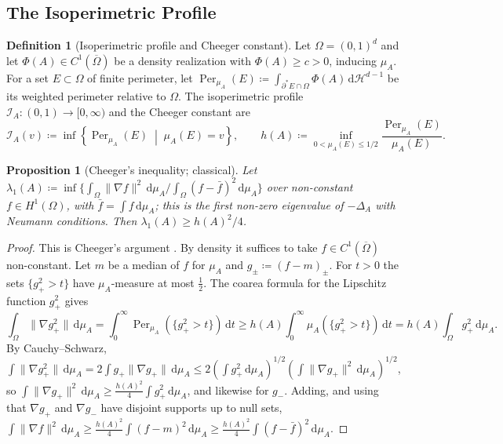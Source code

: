 \documentclass[11pt,a4paper,reqno]{amsart}
\newtheorem{proposition}[theorem]{Proposition}
\theoremstyle{definition}
\newtheorem{definition}[theorem]{Definition}
\numberwithin{equation}{section}
\newcommand{\Per}{\operatorname{Per}}
\newcommand{\dif}{\,\mathrm{d}}
\begin{document}
\subsection{The Isoperimetric Profile}
\begin{definition}[Isoperimetric profile and Cheeger constant]
Let $\Omega = (0,1)^d$ and let $\Phi(A) \in C^1(\overline{\Omega})$ be a density realization with $\Phi(A) \ge c > 0$, inducing $\mu_A$. For a set $E \subset \Omega$ of finite perimeter, let $\Per_{\mu_A}(E) \coloneqq \int_{\partial^* E \cap \Omega} \Phi(A) \dif \mathcal{H}^{d-1}$ be its weighted perimeter relative to $\Omega$. The isoperimetric profile $\mathcal{I}_A \colon (0, 1) \to [0,\infty)$ and the Cheeger constant are
\begin{equation}
    \mathcal{I}_A(v) \coloneqq \inf \left\{ \Per_{\mu_A}(E) \;\middle|\; \mu_A(E) = v \right\}, \qquad h(A) \coloneqq \inf_{0 < \mu_A(E) \le 1/2} \frac{\Per_{\mu_A}(E)}{\mu_A(E)}.
\end{equation}
\end{definition}

\begin{proposition}[Cheeger's inequality; classical]
\label{prop:cheeger}
Let $\lambda_1(A) \coloneqq \inf\{ \int_\Omega \|\nabla f\|^2 \dif\mu_A / \int_\Omega (f - \bar f)^2 \dif\mu_A \}$ over non-constant $f \in H^1(\Omega)$, with $\bar f = \int f \dif\mu_A$; this is the first non-zero eigenvalue of $-\Delta_A$ with Neumann conditions. Then $\lambda_1(A) \ge h(A)^2/4$.
\end{proposition}

\begin{proof}
This is Cheeger's argument \cite{cheeger1970lower}. By density it suffices to take $f \in C^1(\overline{\Omega})$ non-constant. Let $m$ be a median of $f$ for $\mu_A$ and $g_\pm \coloneqq (f - m)_\pm$. For $t > 0$ the sets $\{g_+^2 > t\}$ have $\mu_A$-measure at most $\frac12$. The coarea formula for the Lipschitz function $g_+^2$ \cite{evans2015measure} gives
\begin{equation}
    \int_\Omega \|\nabla g_+^2\| \dif\mu_A = \int_0^\infty \Per_{\mu_A}(\{g_+^2 > t\}) \dif t \ge h(A) \int_0^\infty \mu_A(\{g_+^2 > t\}) \dif t = h(A) \int_\Omega g_+^2 \dif\mu_A.
\end{equation}
By Cauchy--Schwarz, $\int \|\nabla g_+^2\| \dif\mu_A = 2\int g_+\|\nabla g_+\| \dif\mu_A \le 2 (\int g_+^2 \dif\mu_A)^{1/2} (\int \|\nabla g_+\|^2 \dif\mu_A)^{1/2}$, so $\int \|\nabla g_+\|^2 \dif\mu_A \ge \frac{h(A)^2}{4}\int g_+^2 \dif\mu_A$, and likewise for $g_-$. Adding, and using that $\nabla g_+$ and $\nabla g_-$ have disjoint supports up to null sets, $\int \|\nabla f\|^2 \dif\mu_A \ge \frac{h(A)^2}{4} \int (f-m)^2 \dif\mu_A \ge \frac{h(A)^2}{4} \int (f - \bar f)^2 \dif\mu_A$.
\end{proof}
\end{document}
